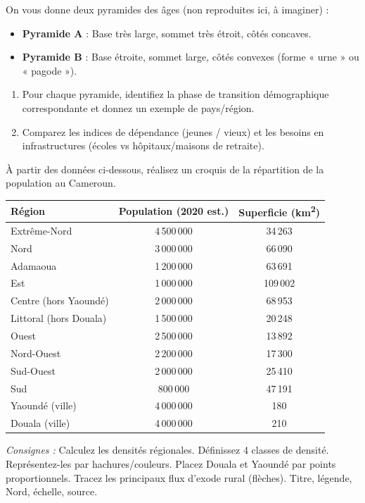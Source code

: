 \documentclass[11pt]{article}
\begin{document}
\begin{exercice}
On vous donne deux pyramides des âges (non reproduites ici, à imaginer) :
\begin{itemize}
\item \textbf{Pyramide A} : Base très large, sommet très étroit, côtés concaves.
\item \textbf{Pyramide B} : Base étroite, sommet large, côtés convexes (forme « urne » ou « pagode »).
\end{itemize}
\begin{enumerate}
\item Pour chaque pyramide, identifiez la phase de transition démographique correspondante et donnez un exemple de pays/région.
\item Comparez les indices de dépendance (jeunes / vieux) et les besoins en infrastructures (écoles vs hôpitaux/maisons de retraite).
\end{enumerate}
\end{exercice}

\begin{exercice}
À partir des données ci-dessous, réalisez un croquis de la répartition de la population au Cameroun.
\begin{center}
\begin{tabular}{|l|c|c|}\hline
\textbf{Région} & \textbf{Population (2020 est.)} & \textbf{Superficie (km\textsuperscript{2})} \\ \hline
Extrême-Nord & 4\,500\,000 & 34\,263 \\
Nord & 3\,000\,000 & 66\,090 \\
Adamaoua & 1\,200\,000 & 63\,691 \\
Est & 1\,000\,000 & 109\,002 \\
Centre (hors Yaoundé) & 2\,000\,000 & 68\,953 \\
Littoral (hors Douala) & 1\,500\,000 & 20\,248 \\
Ouest & 2\,500\,000 & 13\,892 \\
Nord-Ouest & 2\,200\,000 & 17\,300 \\
Sud-Ouest & 2\,000\,000 & 25\,410 \\
Sud & 800\,000 & 47\,191 \\
Yaoundé (ville) & 4\,000\,000 & 180 \\
Douala (ville) & 4\,000\,000 & 210 \\ \hline
\end{tabular}
\end{center}
\textit{Consignes :} Calculez les densités régionales. Définissez 4 classes de densité. Représentez-les par hachures/couleurs. Placez Douala et Yaoundé par points proportionnels. Tracez les principaux flux d'exode rural (flèches). Titre, légende, Nord, échelle, source.
\end{exercice}
\end{document}

